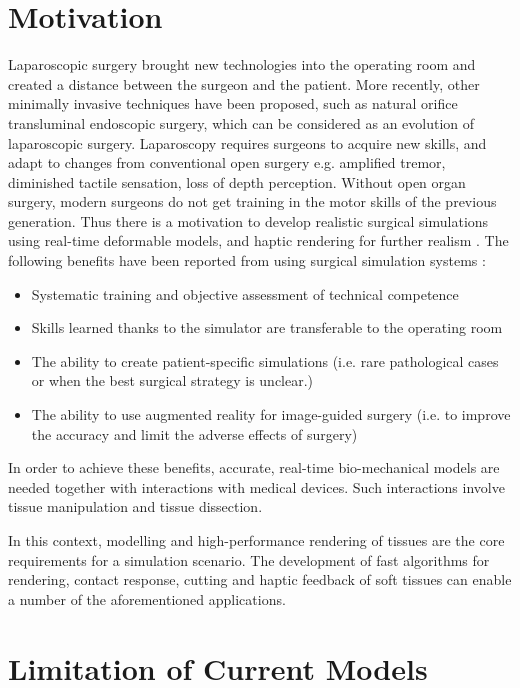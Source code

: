\section{Motivation}

Laparoscopic surgery brought new technologies into the operating room and created a 
distance between the surgeon and the patient. More recently, other minimally invasive techniques have 
been proposed, such as natural orifice transluminal endoscopic surgery, which can be considered as an 
evolution of laparoscopic surgery. Laparoscopy requires surgeons to acquire new skills, and adapt 
to changes from conventional open surgery e.g. amplified tremor, diminished tactile sensation, loss of 
depth perception.  Without open organ surgery, modern surgeons do not get 
training in the motor skills of the previous generation. Thus there is a 
motivation to develop realistic surgical simulations using 
real-time deformable models, and haptic rendering for further realism \cite{Lin2004}. 
The following benefits have been reported from 
using surgical simulation systems \cite{Liu2003, Basdogan2004}: 

\begin{itemize}
 \item Systematic training and objective assessment of technical competence
 \item Skills learned thanks to the simulator are transferable to the operating room
 \item The ability to create patient-specific simulations (i.e. rare pathological cases or when the best 
 surgical strategy is unclear.)
 \item The ability to use augmented reality for image-guided surgery (i.e. to improve the accuracy and 
 limit the adverse effects of surgery)
\end{itemize}

In order to achieve these benefits, accurate, real-time bio-mechanical models are needed together
with interactions with medical devices. Such interactions involve tissue manipulation and tissue dissection. 

In this context, modelling and high-performance rendering of tissues are the core requirements for 
a simulation scenario. The development of fast algorithms for rendering, contact response, 
cutting and haptic feedback of soft tissues can enable a number of the aforementioned applications.


\section{Limitation of Current Models}
\label{sec:limitationsOfCurrentModels}

